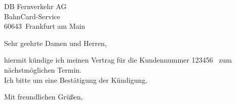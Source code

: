 \documentclass[a4paper, 12pt, KOMAold]{scrlttr2}
\newcommand{\Kundennr}{123456}    %
\newcommand{\Empfaenger}{DB Fernverkehr AG} %
\newcommand{\EStrasse}{BahnCard-Service}    %
\newcommand{\EPLZ}{60643}                   %
\newcommand{\EOrt}{Frankfurt am Main}       %
\newcommand{\Kuendigungsdatum}{nächstmöglichen Termin}              %
\begin{document}
    \begin{letter}{\Empfaenger \\ \EStrasse \\ \EPLZ~\EOrt}
    \date{\today}%
    \subject{Kündigung}
    \opening{Sehr geehrte Damen und Herren,}
    hiermit kündige ich meinen Vertrag für die Kundennummer
    \Kundennr~ zum \Kuendigungsdatum.\\

    \noindent Ich bitte um eine Bestätigung der Kündigung.
    \closing{Mit freundlichen Grüßen,}
    \end{letter}
\end{document}
